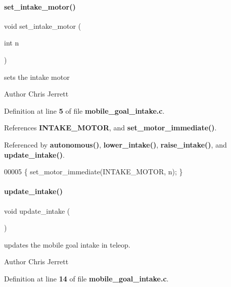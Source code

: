 \paragraph{set\+\_\+intake\+\_\+motor()}
{\footnotesize\ttfamily void set\+\_\+intake\+\_\+motor (\begin{DoxyParamCaption}\item[{int}]{n }\end{DoxyParamCaption})}



sets the intake motor 

\begin{DoxyAuthor}{Author}
Chris Jerrett 
\end{DoxyAuthor}


Definition at line \textbf{ 5} of file \textbf{ mobile\+\_\+goal\+\_\+intake.\+c}.



References \textbf{ I\+N\+T\+A\+K\+E\+\_\+\+M\+O\+T\+OR}, and \textbf{ set\+\_\+motor\+\_\+immediate()}.



Referenced by \textbf{ autonomous()}, \textbf{ lower\+\_\+intake()}, \textbf{ raise\+\_\+intake()}, and \textbf{ update\+\_\+intake()}.


\begin{DoxyCode}
00005 \{ set_motor_immediate(INTAKE_MOTOR, n); \}
\end{DoxyCode}
\mbox{\label{a00131_a5d7bad8a208988af743fd2e68f111286}} 
\paragraph{update\+\_\+intake()}
{\footnotesize\ttfamily void update\+\_\+intake (\begin{DoxyParamCaption}{ }\end{DoxyParamCaption})}



updates the mobile goal intake in teleop. 

\begin{DoxyAuthor}{Author}
Chris Jerrett 
\end{DoxyAuthor}


Definition at line \textbf{ 14} of file \textbf{ mobile\+\_\+goal\+\_\+intake.\+c}.



